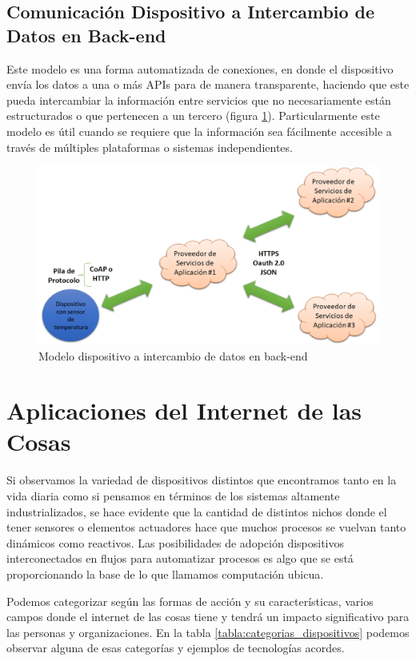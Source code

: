 \subsection{Comunicación Dispositivo a Intercambio de Datos en Back-end}
Este modelo es una forma automatizada de conexiones, en donde el dispositivo envía los datos a una o más APIs para de manera transparente, haciendo que este pueda intercambiar la información entre servicios que no necesariamente están estructurados o que pertenecen a un tercero (figura \ref{fig:d2b}). Particularmente este modelo es útil cuando se requiere que la información sea fácilmente accesible a través de múltiples plataformas o sistemas independientes.
\begin{figure}[htb]
\centering
\includegraphics[scale=0.4]{./Figuras/d2b.png}
\caption{Modelo dispositivo a intercambio de datos en back-end}
\label{fig:d2b}
\vspace*{-10pt}
\end{figure}

\section{Aplicaciones del Internet de las Cosas}
Si observamos la variedad de dispositivos distintos que encontramos tanto en la vida diaria como si pensamos en términos de los sistemas altamente industrializados, se hace evidente que la cantidad de distintos nichos donde el tener sensores o elementos actuadores hace que muchos procesos se vuelvan tanto dinámicos como reactivos. Las posibilidades de adopción dispositivos interconectados en flujos para automatizar procesos es algo que se está proporcionando la base de lo que llamamos computación ubicua.

Podemos categorizar según las formas de acción y su características, varios campos donde el internet de las cosas tiene y tendrá un impacto significativo para las personas y organizaciones. En la tabla \ref{tabla:categorias_dispositivos} podemos observar alguna de esas categorías y ejemplos de tecnologías acordes.\cite{tablaiot}

